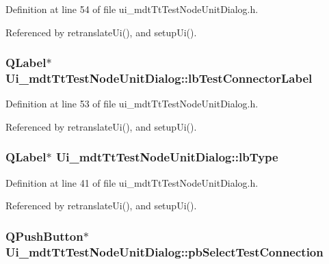 Definition at line 54 of file ui\-\_\-mdt\-Tt\-Test\-Node\-Unit\-Dialog.\-h.



Referenced by retranslate\-Ui(), and setup\-Ui().

\hypertarget{class_ui__mdt_tt_test_node_unit_dialog_a93fba00c355dabfb4a70b534d764ca1f}{
\subsubsection[{lb\-Test\-Connector\-Label}]{\setlength{\rightskip}{0pt plus 5cm}Q\-Label$\ast$ Ui\-\_\-mdt\-Tt\-Test\-Node\-Unit\-Dialog\-::lb\-Test\-Connector\-Label}}\label{class_ui__mdt_tt_test_node_unit_dialog_a93fba00c355dabfb4a70b534d764ca1f}


Definition at line 53 of file ui\-\_\-mdt\-Tt\-Test\-Node\-Unit\-Dialog.\-h.



Referenced by retranslate\-Ui(), and setup\-Ui().

\hypertarget{class_ui__mdt_tt_test_node_unit_dialog_a974b718f19d01de20d8a82dffd767af6}{
\subsubsection[{lb\-Type}]{\setlength{\rightskip}{0pt plus 5cm}Q\-Label$\ast$ Ui\-\_\-mdt\-Tt\-Test\-Node\-Unit\-Dialog\-::lb\-Type}}\label{class_ui__mdt_tt_test_node_unit_dialog_a974b718f19d01de20d8a82dffd767af6}


Definition at line 41 of file ui\-\_\-mdt\-Tt\-Test\-Node\-Unit\-Dialog.\-h.



Referenced by retranslate\-Ui(), and setup\-Ui().

\hypertarget{class_ui__mdt_tt_test_node_unit_dialog_a58543efcb6478cc2c4fe3d60e747af3a}{
\subsubsection[{pb\-Select\-Test\-Connection}]{\setlength{\rightskip}{0pt plus 5cm}Q\-Push\-Button$\ast$ Ui\-\_\-mdt\-Tt\-Test\-Node\-Unit\-Dialog\-::pb\-Select\-Test\-Connection}}\label{class_ui__mdt_tt_test_node_unit_dialog_a58543efcb6478cc2c4fe3d60e747af3a}


